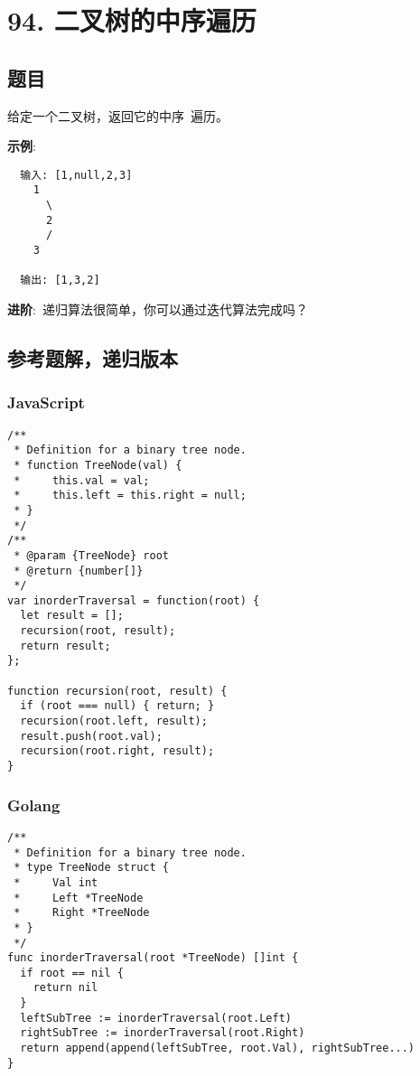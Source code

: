 \newpage
\section{94. 二叉树的中序遍历}
\label{leetcode:94}

\subsection{题目}

给定一个二叉树，返回它的中序 遍历。

\textbf{示例}:

\begin{verbatim}
  输入: [1,null,2,3]
    1
      \
      2
      /
    3

  输出: [1,3,2]
\end{verbatim}

\textbf{进阶}: 递归算法很简单，你可以通过迭代算法完成吗？

\subsection{参考题解，递归版本}

\subsubsection{JavaScript}

\begin{verbatim}
/**
 * Definition for a binary tree node.
 * function TreeNode(val) {
 *     this.val = val;
 *     this.left = this.right = null;
 * }
 */
/**
 * @param {TreeNode} root
 * @return {number[]}
 */
var inorderTraversal = function(root) {
  let result = [];
  recursion(root, result);
  return result;
};

function recursion(root, result) {
  if (root === null) { return; }
  recursion(root.left, result);
  result.push(root.val);
  recursion(root.right, result);
}
\end{verbatim}

\subsubsection{Golang}

\begin{verbatim}
/**
 * Definition for a binary tree node.
 * type TreeNode struct {
 *     Val int
 *     Left *TreeNode
 *     Right *TreeNode
 * }
 */
func inorderTraversal(root *TreeNode) []int {
  if root == nil {
    return nil
  }
  leftSubTree := inorderTraversal(root.Left)
  rightSubTree := inorderTraversal(root.Right)
  return append(append(leftSubTree, root.Val), rightSubTree...)
}
\end{verbatim}

